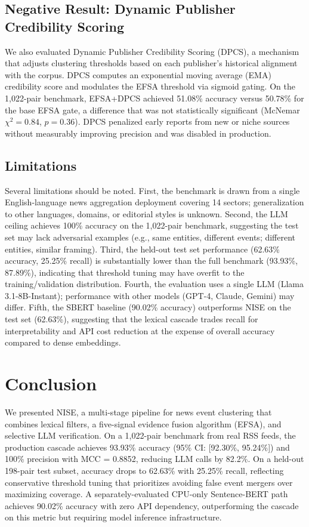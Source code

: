 \documentclass[conference]{IEEEtran}
\begin{document}
\subsection{Negative Result: Dynamic Publisher Credibility Scoring}
We also evaluated Dynamic Publisher Credibility Scoring (DPCS), a mechanism that adjusts clustering thresholds based on each publisher's historical alignment with the corpus.
DPCS computes an exponential moving average (EMA) credibility score and modulates the EFSA threshold via sigmoid gating.
On the 1,022-pair benchmark, EFSA+DPCS achieved 51.08\% accuracy versus 50.78\% for the base EFSA gate, a difference that was not statistically significant (McNemar $\chi^2 = 0.84$, $p = 0.36$).
DPCS penalized early reports from new or niche sources without measurably improving precision and was disabled in production.

\subsection{Limitations}
Several limitations should be noted.
First, the benchmark is drawn from a single English-language news aggregation deployment covering 14 sectors; generalization to other languages, domains, or editorial styles is unknown.
Second, the LLM ceiling achieves 100\% accuracy on the 1,022-pair benchmark, suggesting the test set may lack adversarial examples (e.g., same entities, different events; different entities, similar framing).
Third, the held-out test set performance (62.63\% accuracy, 25.25\% recall) is substantially lower than the full benchmark (93.93\%, 87.89\%), indicating that threshold tuning may have overfit to the training/validation distribution.
Fourth, the evaluation uses a single LLM (Llama 3.1-8B-Instant); performance with other models (GPT-4, Claude, Gemini) may differ.
Fifth, the SBERT baseline (90.02\% accuracy) outperforms NISE on the test set (62.63\%), suggesting that the lexical cascade trades recall for interpretability and API cost reduction at the expense of overall accuracy compared to dense embeddings.

\section{Conclusion}

We presented NISE, a multi-stage pipeline for news event clustering that combines lexical filters, a five-signal evidence fusion algorithm (EFSA), and selective LLM verification.
On a 1,022-pair benchmark from real RSS feeds, the production cascade achieves 93.93\% accuracy (95\% CI: [92.30\%, 95.24\%]) and 100\% precision with MCC = 0.8852, reducing LLM calls by 82.2\%.
On a held-out 198-pair test subset, accuracy drops to 62.63\% with 25.25\% recall, reflecting conservative threshold tuning that prioritizes avoiding false event mergers over maximizing coverage.
A separately-evaluated CPU-only Sentence-BERT path achieves 90.02\% accuracy with zero API dependency, outperforming the cascade on this metric but requiring model inference infrastructure.
\end{document}
